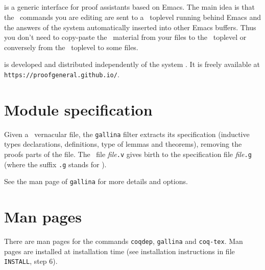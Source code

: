 \subsection[{\ProofGeneral}]{{\ProofGeneral}}

{\ProofGeneral} is a generic interface for proof assistants based on
Emacs. The main idea is that the \Coq\ commands you are
editing are sent to a \Coq\ toplevel running behind Emacs and the
answers of the system automatically inserted into other Emacs buffers.
Thus you don't need to copy-paste the \Coq\ material from your files
to the \Coq\ toplevel or conversely from the \Coq\ toplevel to some
files.

{\ProofGeneral} is developed and distributed independently of the
system \Coq. It is freely available at \verb!https://proofgeneral.github.io/!.


\section[Module specification]{Module specification\label{gallina}}

Given a \Coq\ vernacular file, the {\tt gallina} filter extracts its
specification (inductive types declarations, definitions, type of
lemmas and theorems), removing the proofs parts of the file. The \Coq\
file {\em file}{\tt.v} gives birth to the specification file
{\em file}{\tt.g} (where the suffix {\tt.g} stands for \gallina).

See the man page of {\tt gallina} for more details and options.


\section[Man pages]{Man pages\label{ManPages}}

There are man pages for the commands {\tt coqdep}, {\tt gallina} and
{\tt coq-tex}. Man pages are installed at installation time
(see installation instructions in file {\tt INSTALL}, step 6).



